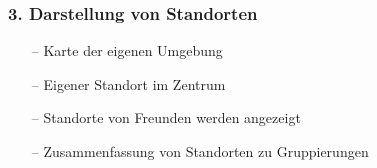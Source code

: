 \documentclass[aspectratio=1610]{beamer}
\begin{document}
	\begin{frame}[plain]
	\frametitle{3. Darstellung von Standorten}
		\begin{minipage}{0.5\textwidth}
			\setlength{\fboxsep}{0pt}%
			\setlength{\fboxrule}{1pt}%
			\captionsetup{labelformat=empty}
			\centering
		\end{minipage}%
		\begin{minipage}{0.5\textwidth}
			\begin{itemize}
				\setlength\itemsep{0.3em}
				\item[--] Karte der eigenen Umgebung
				\item[--] Eigener Standort im Zentrum
				\item[--] Standorte von Freunden werden angezeigt
				\item[--] Zusammenfassung von Standorten zu Gruppierungen
			\end{itemize}
		\end{minipage}%
	\end{frame}
\end{document}
